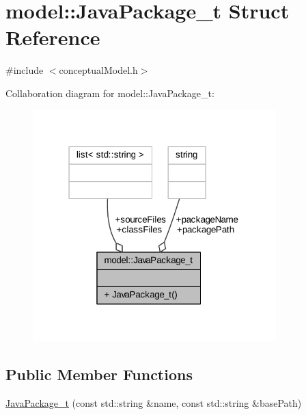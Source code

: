 \hypertarget{structmodel_1_1_java_package__t}{}\section{model\+:\+:Java\+Package\+\_\+t Struct Reference}
\label{structmodel_1_1_java_package__t}


{\ttfamily \#include $<$conceptual\+Model.\+h$>$}



Collaboration diagram for model\+:\+:Java\+Package\+\_\+t\+:
\nopagebreak
\begin{figure}[H]
\begin{center}
\leavevmode
\includegraphics[width=267pt]{structmodel_1_1_java_package__t__coll__graph}
\end{center}
\end{figure}
\subsection*{Public Member Functions}
\begin{DoxyCompactItemize}
\item 
\hyperlink{structmodel_1_1_java_package__t_a1e1fec25326b5f4ebcaa149f48d7dfae}{Java\+Package\+\_\+t} (const std\+::string \&name, const std\+::string \&base\+Path)
\end{DoxyCompactItemize}
